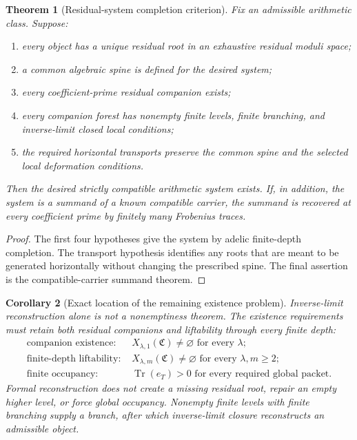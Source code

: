 \documentclass[11pt]{article}
\newtheorem{theorem}{Theorem}[section]
\newtheorem{corollary}[theorem]{Corollary}
\theoremstyle{definition}
\theoremstyle{remark}
\newcommand{\Tr}{\operatorname{Tr}}
\newcommand{\Compat}{\mathfrak C}
\begin{document}
\begin{theorem}[Residual-system completion criterion]\label{px:11.1}
Fix an admissible arithmetic class.  Suppose:
\begin{enumerate}
\item every object has a unique residual root in an exhaustive residual moduli space;
\item a common algebraic spine is defined for the desired system;
\item every coefficient-prime residual companion exists;
\item every companion forest has nonempty finite levels, finite branching, and inverse-limit closed local conditions;
\item the required horizontal transports preserve the common spine and the selected local deformation conditions.
\end{enumerate}
Then the desired strictly compatible arithmetic system exists.  If, in addition, the system is a summand of a known compatible carrier, the summand is recovered at every coefficient prime by finitely many Frobenius traces.
\end{theorem}

\begin{proof}
The first four hypotheses give the system by adelic finite-depth completion.  The transport hypothesis identifies any roots that are meant to be generated horizontally without changing the prescribed spine.  The final assertion is the compatible-carrier summand theorem.
\end{proof}

\begin{corollary}[Exact location of the remaining existence problem]\label{px:11.2}
Inverse-limit reconstruction alone is not a nonemptiness theorem.  The existence requirements must retain both residual companions and liftability through every finite depth:
\[
\boxed{
\begin{aligned}
\text{companion existence: }&X_{\lambda,1}(\Compat)\ne\varnothing
\text{ for every }\lambda;\\
\text{finite-depth liftability: }&X_{\lambda,m}(\Compat)\ne\varnothing
\text{ for every }\lambda,m\ge2;\\
\text{finite occupancy: }&\Tr(e_T)>0
\text{ for every required global packet.}
\end{aligned}}
\]
Formal reconstruction does not create a missing residual root, repair an empty higher level, or force global occupancy.  Nonempty finite levels with finite branching supply a branch, after which inverse-limit closure reconstructs an admissible object.
\end{corollary}
\end{document}
